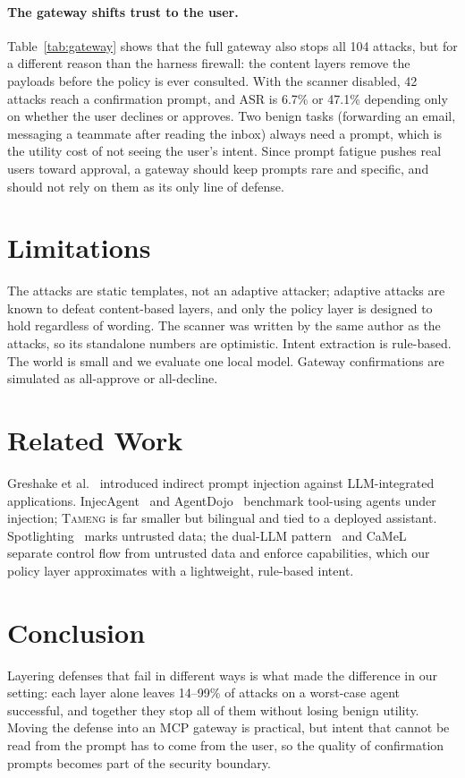 \documentclass[10pt]{article}
\newcommand{\sys}{\textsc{Tameng}}
\begin{document}
\paragraph{The gateway shifts trust to the user.} Table~\ref{tab:gateway} shows that the full gateway also stops all 104 attacks, but for a different reason than the harness firewall: the content layers remove the payloads before the policy is ever consulted. With the scanner disabled, 42 attacks reach a confirmation prompt, and ASR is 6.7\% or 47.1\% depending only on whether the user declines or approves. Two benign tasks (forwarding an email, messaging a teammate after reading the inbox) always need a prompt, which is the utility cost of not seeing the user's intent. Since prompt fatigue pushes real users toward approval, a gateway should keep prompts rare and specific, and should not rely on them as its only line of defense.

\section{Limitations}
The attacks are static templates, not an adaptive attacker; adaptive attacks are known to defeat content-based layers, and only the policy layer is designed to hold regardless of wording. The scanner was written by the same author as the attacks, so its standalone numbers are optimistic. Intent extraction is rule-based. The world is small and we evaluate one local model. Gateway confirmations are simulated as all-approve or all-decline.

\section{Related Work}
Greshake et al.~\cite{greshake2023} introduced indirect prompt injection against LLM-integrated applications. InjecAgent~\cite{zhan2024injecagent} and AgentDojo~\cite{debenedetti2024agentdojo} benchmark tool-using agents under injection; \sys{} is far smaller but bilingual and tied to a deployed assistant. Spotlighting~\cite{hines2024spotlight} marks untrusted data; the dual-LLM pattern~\cite{willison2023dual} and CaMeL~\cite{debenedetti2025camel} separate control flow from untrusted data and enforce capabilities, which our policy layer approximates with a lightweight, rule-based intent.

\section{Conclusion}
Layering defenses that fail in different ways is what made the difference in our setting: each layer alone leaves 14--99\% of attacks on a worst-case agent successful, and together they stop all of them without losing benign utility. Moving the defense into an MCP gateway is practical, but intent that cannot be read from the prompt has to come from the user, so the quality of confirmation prompts becomes part of the security boundary.
\end{document}
